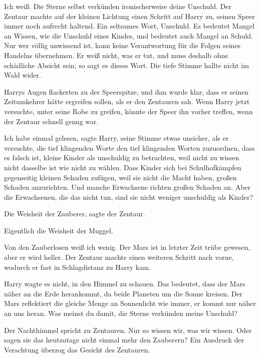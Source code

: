 \glqq{}Ich weiß. Die Sterne selbst verkünden ironischerweise deine Unschuld.\grqq{} Der
Zentaur machte auf der kleinen Lichtung einen Schritt auf Harry zu, seinen Speer
immer noch aufrecht haltend. \glqq{}Ein seltsames Wort, Unschuld. Es bedeutet
Mangel an Wissen, wie die Unschuld eines Kindes, und bedeutet auch Mangel an
Schuld. Nur wer völlig unwissend ist, kann keine Verantwortung für die Folgen
seines Handelns übernehmen. Er weiß nicht, was er tut, und muss deshalb ohne
schädliche Absicht sein; so sagt es dieses Wort.\grqq{} Die tiefe Stimme hallte nicht
im Wald wider.

Harrys Augen flackerten zu der Speerspitze, und ihm wurde klar, dass er seinen
Zeitumkehrer hätte ergreifen sollen, als er den Zentauren sah. Wenn Harry jetzt
versuchte, unter seine Robe zu greifen, könnte der Speer ihn vorher treffen,
wenn der Zentaur schnell genug war.

\glqq{}Ich habe einmal gelesen\grqq{}, sagte Harry, seine Stimme etwas unsicher,
als er versuchte, die tief klingenden Worte den tief klingenden Worten
zuzuordnen, \glqq{}dass es falsch ist, kleine Kinder als unschuldig zu
betrachten, weil nicht zu wissen nicht dasselbe ist wie nicht zu wählen. Dass
Kinder sich bei Schulhofkämpfen gegenseitig kleinen Schaden zufügen, weil sie
nicht die Macht haben, großen Schaden anzurichten. Und manche Erwachsene richten
großen Schaden an. Aber die Erwachsenen, die das nicht tun, sind sie nicht
weniger unschuldig als Kinder?\grqq{}

\glqq{}Die Weisheit der Zauberer\grqq{}, sagte der Zentaur.

\glqq{}Eigentlich die Weisheit der Muggel.\grqq{}

\glqq{}Von den Zauberlosen weiß ich wenig. Der Mars ist in letzter Zeit trübe
gewesen, aber er wird heller.\grqq{} Der Zentaur machte einen weiteren Schritt
nach vorne, wodurch er fast in Schlagdistanz zu Harry kam.

Harry wagte es nicht, in den Himmel zu schauen. \glqq{}Das bedeutet, dass der
Mars näher an die Erde herankommt, da beide Planeten um die Sonne kreisen. Der
Mars reflektiert die gleiche Menge an Sonnenlicht wie immer, er kommt nur näher
an uns heran. Was meinst du damit, die Sterne verkünden meine Unschuld?\grqq{}

\glqq{}Der Nachthimmel spricht zu Zentauren. Nur so wissen wir, was wir wissen.
Oder sagen sie das heutzutage nicht einmal mehr den Zauberern?\grqq{} Ein Ausdruck der
Verachtung überzog das Gesicht des Zentauren.

